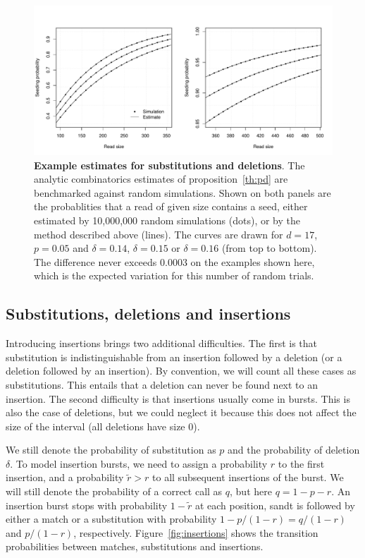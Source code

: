 \documentclass{article}
\begin{document}
\begin{figure}[h]
\centering
\includegraphics[scale=0.445]{simulpdel.pdf}
\caption{\textbf{Example estimates for substitutions and deletions}. The
analytic combinatorics estimates of proposition~\ref{th:pd} are
benchmarked against random simulations. Shown on both panels are the
probablities that a read of given size contains a seed, either estimated
by 10,000,000 random simulations (dots), or by the method described above
(lines). The curves are drawn for $d=17$, $p=0.05$ and $\delta=0.14$,
$\delta=0.15$ or $\delta=0.16$ (from top to bottom). The difference never
exceeds 0.0003 on the examples shown here, which is the expected variation
for this number of random trials.}
\label{fig:simulpdel}
\end{figure}





\subsection{Substitutions, deletions and insertions}
\label{sec:insertions}

Introducing insertions brings two additional difficulties. The first is
that substitution is indistinguishable from an insertion followed by a
deletion (or a deletion followed by an insertion). By convention, we will
count all these cases as substitutions. This entails that a deletion can
never be found next to an insertion. The second difficulty is that
insertions usually come in bursts. This is also the case of deletions, but
we could neglect it because this does not affect the size of the interval
(all deletions have size $0$). 

We still denote the probability of substitution as $p$ and the probability
of deletion $\delta$. To model insertion bursts, we need to assign a
probability $r$ to the first insertion, and a probability $\tilde{r} > r$
to all subsequent insertions of the burst. We will still denote the
probability of a correct call as $q$, but here $q = 1-p-r$.  An insertion
burst stops with probability $1-\tilde{r}$ at each position, sandt is
followed by either a match or a substitution with probability $1-p/(1-r) =
q/(1-r)$ and $p/(1-r)$, respectively. Figure~\ref{fig:insertions} shows
the transition probabilities between matches, substitutions and
insertions.
\end{document}

